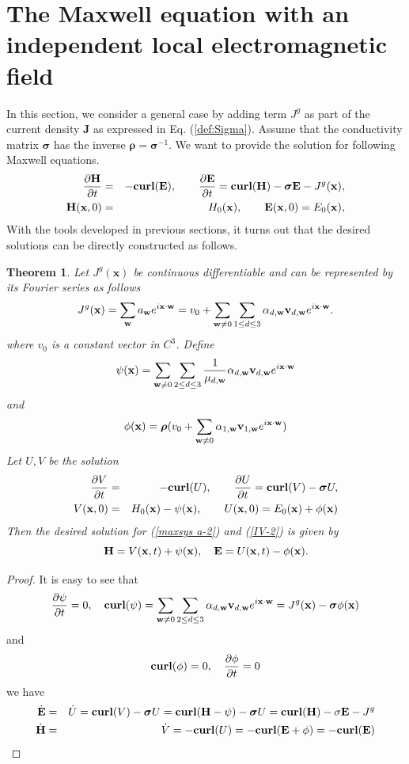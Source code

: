 \documentclass[10pt,reqno]{amsart}
\newcommand{\bS}{\boldsymbol{\sigma}}
\newcommand{\brho}{\boldsymbol{\rho}}
\renewcommand{\(}{\left(}
\renewcommand{\)}{\right)}
\newcommand{\bv}{{\bf v}}
\newcommand{\bw}{{\bf w}}
\newcommand{\HH}{{\bf H}}
\newcommand{\EE}{{\bf E}}
\newcommand{\CU}{{\bf curl}}
\newcommand{\bx}{\mathbf{x}}
\newcommand{\bJ}{\mathbf{J}}
\newtheorem{theo}{Theorem}[section]
\numberwithin{equation}{section}
\begin{document}
\section{The Maxwell equation with an independent local electromagnetic field}\label{sec:jg}
In this section, we consider a general case by adding term $J^g$ as part of the current density $\bJ$ as expressed in Eq. (\ref{def:Sigma}).  Assume that the conductivity matrix $\bS$ has the inverse $\boldsymbol {\rho } = \bS^{-1}$. We want to provide the solution for following Maxwell equations.
\begin{eqnarray}
\frac{\partial \HH}{\partial t} &=&-\CU (\EE), \qquad  \frac{\partial \EE}{\partial t} = \CU  (\HH) -  \bS \EE -  J^g(\bx), \label{maxsys a-2}\\
\HH(\bx,0) &=& H_0(\bx) ,\qquad  \EE(\bx,0) =E_0(\bx), \label{IV-2}
\end{eqnarray}
With the tools developed in previous sections,  it turns out that the desired solutions can be directly constructed as follows. 
\begin{theo}\label{theorem-main-3}
Let $J^g(\bx)$ be continuous differentiable and can be represented by its Fourier series as follows
\[
J^g(\bx) = \sum_{\bw} a_{\bw}e^{i\bx\cdot \bw} = v_0 + \sum_{\bw\neq 0} \sum_{1\le d \le 3} \alpha_{d,\bw}\bv_{d,\bw} e^{i\bx\cdot \bw}.
\]
where $v_0$ is a constant vector in $C^3$.
Define 
\[
\psi(\bx)= \sum_{\bw \neq 0} \sum_{2\le d \le 3} \frac{1}{\mu_{d,\bw}} \alpha_{d,\bw}\bv_{d,\bw} e^{i\bx\cdot \bw} 
\]
and
\[
\phi(\bx) = \brho (v_0 + \sum_{\bw \neq 0} \alpha_{1,\bw}\bv_{1,\bw} e^{i\bx\cdot \bw})
\]
Let $U, V$ be the solution 
\begin{eqnarray*}
	\frac{\partial V}{\partial t} &=&-\CU (U), \qquad  \frac{\partial U}{\partial t} = \CU  (V) -  \bS U, \label{maxsys a-home}\\
	V(\bx,0) &=& H_0(\bx) - \psi(\bx) ,\qquad  U(\bx,0) = E_0(\bx) + \phi(\bx)  
\end{eqnarray*}
Then the desired solution for (\ref{maxsys a-2}) and (\ref{IV-2}) is given by
\[
\HH = V(\bx, t) +\psi(\bx), \quad \EE= U(\bx, t)-\phi(\bx).
\]
\end{theo}
\begin{proof}
It is easy to see that
\[
\frac{\partial \psi} {\partial t}=0, \quad
\CU (\psi) =\sum_{\bw \neq 0} \sum_{2\le d \le 3}  \alpha_{d,\bw}\bv_{d,\bw} e^{i\bx\cdot \bw}  = J^g(\bx) - \bS \phi(\bx) 
\]
and
\[
\CU  (\phi) =0, \quad   \frac{\partial \phi} {\partial t} = 0
\]
 we have
	\begin{eqnarray*}
		\dot \EE &=& \dot U = \CU (V)-\bS U = \CU (\HH-\psi) - \bS U  = \CU (\HH) -\sigma \EE - J^g\\
		\dot \HH &=& \dot V = -\CU (U) = - \CU (\EE + \phi) = -\CU (\EE)
	\end{eqnarray*}

\end{proof}
\end{document}
